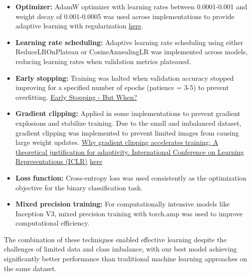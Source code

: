 \documentclass[a4paper,12pt]{report}
\begin{document}
\begin{itemize}
    \item \textbf{Optimizer:} AdamW optimizer with learning rates between 0.0001-0.001 and weight decay of 0.001-0.0005 was used across implementations to provide adaptive learning with regularization \href{https://openreview.net/forum?id=Bkg6RiCqY7}{here}.
    
    \item \textbf{Learning rate scheduling:} Adaptive learning rate scheduling using either ReduceLROnPlateau or CosineAnnealingLR was implemented across models, reducing learning rates when validation metrics plateaued.
    
    \item \textbf{Early stopping:} Training was halted when validation accuracy stopped improving for a specified number of epochs (patience = 3-5) to prevent overfitting. \href{https://link.springer.com/chapter/10.1007/3-540-49430-8_3}{Early Stopping - But When?} 
    
    \item \textbf{Gradient clipping:} Applied in some implementations to prevent gradient explosions and stabilize training. Due to the small and imbalanced dataset, gradient clipping was implemented to prevent limited images from causing large weight updates. \href{Zhang, J., He, T., Sra, S., \& Jadbabaie, A. (2020). Why gradient clipping accelerates training: A theoretical justification for adaptivity. International Conference on Learning Representations (ICLR).}{Why gradient clipping accelerates training: A theoretical justification for adaptivity. International Conference on Learning Representations (ICLR)} \href{http://proceedings.mlr.press/v28/pascanu13.pdf}{here}
    
    \item \textbf{Loss function:} Cross-entropy loss was used consistently as the optimization objective for the binary classification task.
    
    \item \textbf{Mixed precision training:} For computationally intensive models like Inception V3, mixed precision training with torch.amp was used to improve computational efficiency.
\end{itemize}

The combination of these techniques enabled effective learning despite the challenges of limited data and class imbalance, with our best model achieving significantly better performance than traditional machine learning approaches on the same dataset.
\end{document}
